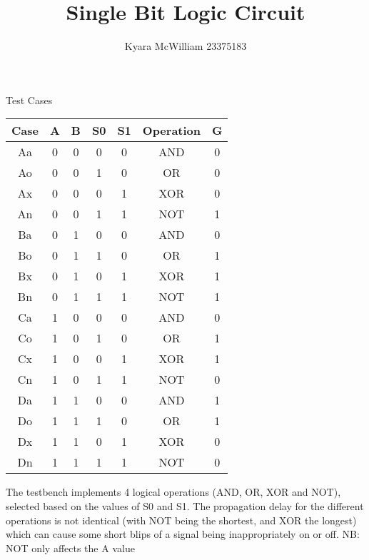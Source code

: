 \documentclass{article}
\title{Single Bit Logic Circuit}
\author{Kyara McWilliam 23375183}
\date{}
\begin{document}
\maketitle

Test Cases
\hfill \break

\begin{tabular}{ |c|c|c|c|c|c|c| }
\hline
Case & A & B & S0 & S1 & Operation & G \\
\hline
Aa & 0 & 0 & 0 & 0 & AND & 0 \\
Ao & 0 & 0 & 1 & 0 & OR & 0 \\
Ax & 0 & 0 & 0 & 1 & XOR & 0 \\
An & 0 & 0 & 1 & 1 & NOT & 1 \\
Ba & 0 & 1 & 0 & 0 & AND & 0 \\
Bo & 0 & 1 & 1 & 0 & OR & 1 \\
Bx & 0 & 1 & 0 & 1 & XOR & 1 \\
Bn & 0 & 1 & 1 & 1 & NOT & 1 \\
Ca & 1 & 0 & 0 & 0 & AND & 0 \\
Co & 1 & 0 & 1 & 0 & OR & 1 \\
Cx & 1 & 0 & 0 & 1 & XOR & 1 \\
Cn & 1 & 0 & 1 & 1 & NOT & 0 \\
Da & 1 & 1 & 0 & 0 & AND & 1 \\
Do & 1 & 1 & 1 & 0 & OR & 1 \\
Dx & 1 & 1 & 0 & 1 & XOR & 0 \\
Dn & 1 & 1 & 1 & 1 & NOT & 0 \\
\hline
\end{tabular}
\hfill \break \break
The testbench implements 4 logical operations (AND, OR, XOR and NOT), selected based on the values of S0 and S1. The propagation delay for the different operations is not identical (with NOT being the shortest, and XOR the longest) which can cause some short blips of a signal being inappropriately on or off.
\hfill \break
NB: NOT only affects the A value
\end{document}
